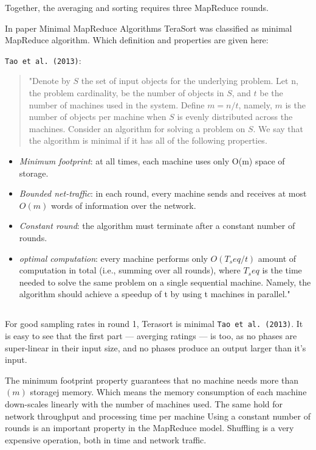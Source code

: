 Together, the averaging and sorting requires three MapReduce rounds.

In paper Minimal MapReduce Algorithms TeraSort was classified as
minimal MapReduce algorithm. Which definition and properties are given
here:

\texttt{Tao et al. (2013)}\citep{minimalmapreduce}:

\begin{quote}
"Denote by $S$ the set of input objects 
for the underlying problem. Let n, the problem cardinality,
be the number of objects in $S$, and $t$ be the number of machines
used in the system. Define $m = n/t$, namely, $m$ is the number
of objects per machine when $S$ is evenly distributed across the
machines. Consider an algorithm for solving a problem on $S$.
We say that the algorithm is minimal if it has all of the following
properties.
\end{quote}

\begin{itemize}
\item \emph{Minimum footprint}: at all times, each machine uses only
O(m) space of storage.
\item \emph{Bounded net-traffic}: in each round, every machine sends
and receives at most $O(m)$ words of information over the
network.
\item  \emph{Constant round}: the algorithm must terminate after a
constant number of rounds.
\item \emph{optimal computation}: every machine performs only
$O(T_seq /t)$ amount of computation in total (i.e., summing
over all rounds), where $T_seq$ is the time needed to solve the
same problem on a single sequential machine. Namely, the
algorithm should achieve a speedup of t by using t machines
in parallel." 
\end{itemize}


\subsection{}
For good sampling rates in round 1, Terasort is minimal \texttt{Tao et al.
(2013)}\citep{minimalmapreduce}. It is easy to see that the first part ---
averging ratings --- is too, as no phases are super-linear in their input size,
and no phases produce an output larger than it's input.

The minimum footprint
property guarantees that no machine needs more than $(m)$ storagej
memory. Which means the memory consumption of each machine down-scales linearly
with the number of machines used. The same
hold for network throughput and processing time per machine
Using a constant number of rounds is an important property in the MapReduce
model. Shuffling is a very expensive operation, both in time and network
traffic.
